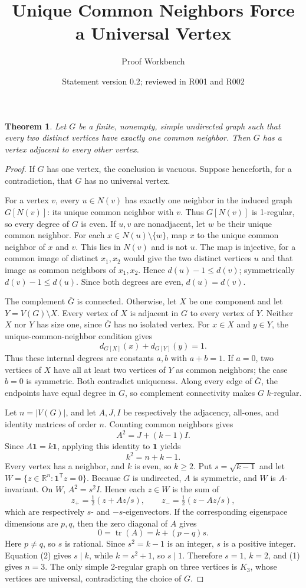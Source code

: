 \documentclass[11pt]{article}
\title{Unique Common Neighbors Force a Universal Vertex}
\author{Proof Workbench}
\date{Statement version 0.2; reviewed in R001 and R002}
\newtheorem{theorem}{Theorem}
\begin{document}
\maketitle

\begin{theorem}
Let $G$ be a finite, nonempty, simple undirected graph such that every two
distinct vertices have exactly one common neighbor. Then $G$ has a vertex
adjacent to every other vertex.
\end{theorem}

\begin{proof}
If $G$ has one vertex, the conclusion is vacuous. Suppose henceforth, for a
contradiction, that $G$ has no universal vertex.

For a vertex $v$, every $u\in N(v)$ has exactly one neighbor in the induced
graph $G[N(v)]$: its unique common neighbor with $v$. Thus $G[N(v)]$ is
1-regular, so every degree of $G$ is even. If $u,v$ are nonadjacent, let $w$ be
their unique common neighbor. For each $x\in N(u)\setminus\{w\}$, map $x$ to
the unique common neighbor of $x$ and $v$. This lies in $N(v)$ and is not $u$.
The map is injective, for a common image of distinct $x_1,x_2$ would give the
two distinct vertices $u$ and that image as common neighbors of $x_1,x_2$.
Hence $d(u)-1\leq d(v)$; symmetrically $d(v)-1\leq d(u)$. Since both degrees
are even, $d(u)=d(v)$.

The complement $\overline G$ is connected. Otherwise, let $X$ be one component
and let $Y=V(G)\setminus X$. Every vertex of $X$ is adjacent in $G$ to every
vertex of $Y$. Neither $X$ nor $Y$ has size one, since $\overline G$ has no
isolated vertex. For $x\in X$ and $y\in Y$, the unique-common-neighbor
condition gives
\[
  d_{G[X]}(x)+d_{G[Y]}(y)=1.
\]
Thus these internal degrees are constants $a,b$ with $a+b=1$. If $a=0$, two
vertices of $X$ have all at least two vertices of $Y$ as common neighbors; the
case $b=0$ is symmetric. Both contradict uniqueness. Along every edge of
$\overline G$, the endpoints have equal degree in $G$, so complement
connectivity makes $G$ $k$-regular.

Let $n=|V(G)|$, and let $A,J,I$ be respectively the adjacency, all-ones, and
identity matrices of order $n$. Counting common neighbors gives
\[
  A^2=J+(k-1)I.
\]
Since $A\mathbf 1=k\mathbf 1$, applying this identity to $\mathbf 1$ yields
\[
  k^2=n+k-1. \tag{1}
\]
Every vertex has a neighbor, and $k$ is even, so $k\geq2$. Put
$s=\sqrt{k-1}$ and let $W=\{z\in\mathbb R^n:\mathbf1^{\mathsf T}z=0\}$.
Because $G$ is undirected, $A$ is symmetric, and $W$ is $A$-invariant. On $W$,
$A^2=s^2I$. Hence each $z\in W$ is the sum of
\[
 z_+=\tfrac12(z+Az/s),\qquad z_-=\tfrac12(z-Az/s),
\]
which are respectively $s$- and $-s$-eigenvectors. If the corresponding
eigenspace dimensions are $p,q$, then the zero diagonal of $A$ gives
\[
  0=\operatorname{tr}(A)=k+(p-q)s. \tag{2}
\]
Here $p\ne q$, so $s$ is rational. Since $s^2=k-1$ is an integer, $s$ is a
positive integer. Equation (2) gives $s\mid k$, while $k=s^2+1$, so $s\mid1$.
Therefore $s=1$, $k=2$, and (1) gives $n=3$. The only simple 2-regular graph on
three vertices is $K_3$, whose vertices are universal, contradicting the choice
of $G$.
\end{proof}
\end{document}
